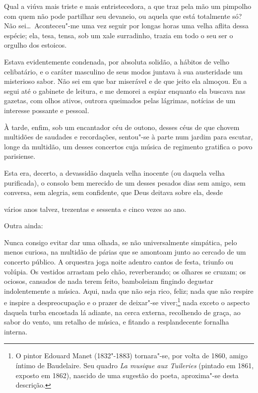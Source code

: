 Qual a viúva mais triste e mais entristecedora, a que traz pela mão
um pimpolho com quem não pode partilhar seu devaneio, ou aquela que
está totalmente só? Não sei\ldots\  Aconteceu"-me uma vez seguir por
longas horas uma velha aflita dessa espécie; ela, tesa, tensa, sob um
xale surradinho, trazia em todo o seu ser o orgulho dos estoicos.

Estava evidentemente condenada, por absoluta solidão, a hábitos
de velho celibatário, e o caráter masculino de seus modos 
juntava à sua austeridade um misterioso sabor. Não sei em que
bar miserável e de que jeito ela almoçou. Eu a segui até o gabinete de
leitura, e me demorei a espiar enquanto ela buscava nas gazetas,
com olhos ativos, outrora queimados pelas lágrimas, notícias de um
interesse possante e pessoal.

À tarde, enfim, sob um encantador céu de outono, desses céus de que chovem multidões de saudades e recordações, sentou"-se à parte num
jardim para escutar, longe da multidão, um desses concertos cuja
música de regimento gratifica o povo parisiense.

Esta era, decerto, a devassidão daquela velha inocente (ou daquela velha
purificada), o consolo bem merecido de um desses pesados dias sem
amigo, sem conversa, sem alegria, sem confidente, que Deus deitava 
sobre ela, desde

\quebra

\noindent{}vários anos talvez, trezentas e sessenta e cinco vezes ao ano.

Outra ainda:

Nunca consigo evitar dar uma olhada, se não universalmente simpática,
pelo menos curiosa, na multidão de párias que se amontoam junto ao
cercado de um concerto público. A orquestra joga noite adentro cantos de festa, triunfo ou volúpia. Os vestidos arrastam pelo chão, reverberando; os
olhares se cruzam; os ociosos, cansados de nada terem feito, bamboleiam fingindo degustar indolentemente a música. Aqui, nada que
não seja rico, feliz; nada que não respire e inspire a despreocupação e o
prazer de deixar"-se viver;\protect\footnote{ O pintor Edouard Manet (1832"-1883) tornara"-se, por volta de 1860,
amigo íntimo de Baudelaire. Seu quadro \textit{La musique aux Tuileries}
(pintado em 1861, exposto em 1862), nascido de uma sugestão do poeta,
aproxima"-se desta descrição.} nada exceto o aspecto
daquela turba encostada lá adiante, na cerca externa, recolhendo de graça,
ao sabor do vento, um retalho de música, e fitando a resplandecente
fornalha interna.

